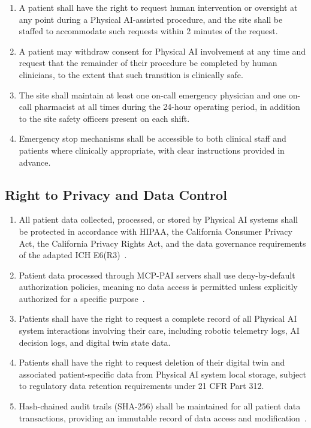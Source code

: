 \begin{enumerate}[label=(\alph*)]
\item A patient shall have the right to request human intervention or oversight
  at any point during a Physical AI-assisted procedure, and the site shall be
  staffed to accommodate such requests within 2 minutes of the request.

\item A patient may withdraw consent for Physical AI involvement at any time and
  request that the remainder of their procedure be completed by human
  clinicians, to the extent that such transition is clinically safe.

\item The site shall maintain at least one on-call emergency physician and one
  on-call pharmacist at all times during the 24-hour operating period, in
  addition to the site safety officers present on each shift.

\item Emergency stop mechanisms shall be accessible to both clinical staff and
  patients where clinically appropriate, with clear instructions provided in
  advance.
\end{enumerate}

\subsection{Right to Privacy and Data Control}

\begin{enumerate}[label=(\alph*)]
\item All patient data collected, processed, or stored by Physical AI systems
  shall be protected in accordance with HIPAA, the California Consumer Privacy
  Act, the California Privacy Rights Act, and the data governance requirements
  of the adapted ICH E6(R3)~\cite{iche6r3adapt}.

\item Patient data processed through MCP-PAI servers shall use deny-by-default
  authorization policies, meaning no data access is permitted unless
  explicitly authorized for a specific purpose~\cite{iche6r3adapt}.

\item Patients shall have the right to request a complete record of all
  Physical AI system interactions involving their care, including robotic
  telemetry logs, AI decision logs, and digital twin state data.

\item Patients shall have the right to request deletion of their digital twin
  and associated patient-specific data from Physical AI system local storage,
  subject to regulatory data retention requirements under 21 CFR Part 312.

\item Hash-chained audit trails (SHA-256) shall be maintained for all patient
  data transactions, providing an immutable record of data access and
  modification~\cite{iche6r3adapt}.
\end{enumerate}

